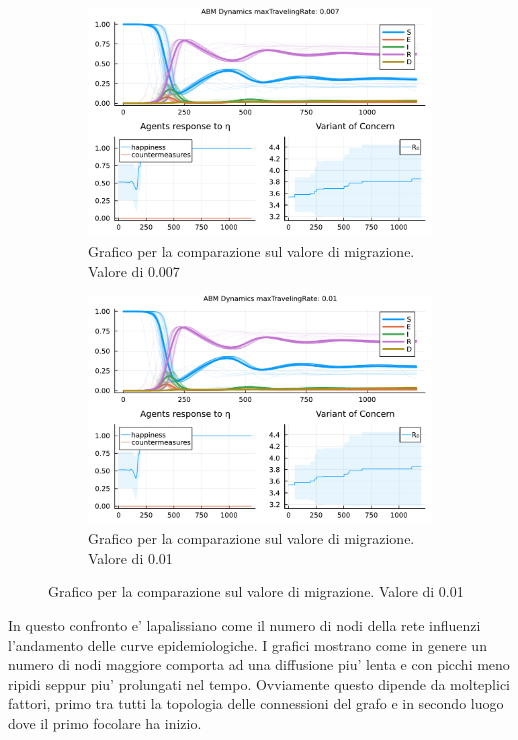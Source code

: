 \begin{figure}[!hb]
\begin{subfigure}[b]{0.45\textwidth}
		\includegraphics[width=\textwidth]{img/SocialNetworkABM_3_MTR.pdf}
		\caption{Grafico per la comparazione sul valore di migrazione. Valore di 0.007}
		\label{fig:comparison_maxTravelingRate_midh}
	\end{subfigure}
	\hfill
	\begin{subfigure}[b]{0.45\textwidth}
		\centering
		\includegraphics[width=\textwidth]{img/SocialNetworkABM_4_MTR.pdf}
		\caption{Grafico per la comparazione sul valore di migrazione. Valore di 0.01}
		\label{fig:comparison_maxTravelingRate_high}
	\end{subfigure}
\end{figure}

\newpage

In questo confronto e' lapalissiano come il numero di nodi della rete influenzi l'andamento delle curve epidemiologiche. 
I grafici mostrano come in genere un numero di nodi maggiore comporta ad una diffusione piu' lenta e con picchi meno ripidi
seppur piu' prolungati nel tempo. Ovviamente questo dipende da molteplici fattori, primo tra tutti la topologia delle connessioni 
del grafo e in secondo luogo dove il primo focolare ha inizio. 

